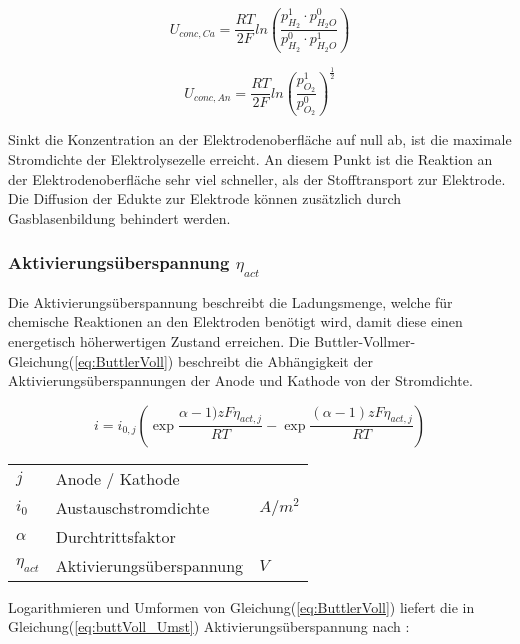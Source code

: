 \documentclass[onecolumn,10pt,titlepage]{article}
\begin{document}
	\begin{equation}
		U_{conc,Ca} = \frac{RT}{2F}ln{\left(\frac{p_{H_2}^1 \cdot p_{H_2O}^0}{p_{H_2}^0\cdot p_{H_2O}^1}\right)}
		\label{eq:konz_Cath}
	\end{equation}

	\begin{equation}
		U_{conc,An} = \frac{RT}{2F}ln{\left(\frac{p_{O_2}^1}{p_{O_2}^0}\right)}^{\frac{1}{2}}
		\label{eq:konz_AN}
	\end{equation}


	Sinkt die Konzentration an der Elektrodenoberfläche auf null ab, ist die maximale Stromdichte der Elektrolysezelle erreicht. An diesem Punkt ist die Reaktion an der Elektrodenoberfläche sehr viel schneller, als der Stofftransport zur Elektrode.\cite{UniversitatUlm.2016} Die Diffusion der Edukte zur Elektrode können zusätzlich durch Gasblasenbildung behindert werden.

	\subsubsection*{Aktivierungsüberspannung $\eta_{act}$}
	Die Aktivierungsüberspannung beschreibt die Ladungsmenge, welche für chemische Reaktionen an den Elektroden benötigt wird, damit diese einen energetisch höherwertigen Zustand erreichen.\cite{Klein.2013} Die Buttler-Vollmer-Gleichung(\ref{eq:ButtlerVoll}) \cite{NI.2007} beschreibt die Abhängigkeit der Aktivierungsüberspannungen der Anode und Kathode von der Stromdichte.

	\begin{equation}
		i=i_{0,j}\left(\exp{\frac{\alpha -1)zF\eta_{act,j}}{RT}-\exp{\frac{(\alpha -1)zF\eta_{act,j}}{RT}}}\right)
		\label{eq:ButtlerVoll}
	\end{equation}


			\begin{table}[H]
				\begin{tabular*}{\textwidth}{lll}
					$j$&Anode / Kathode&\\
					$i_0$&Austauschstromdichte&$A/m^2$\\
					$\alpha$&Durchtrittsfaktor&\\
					$\eta_{act}$&Aktivierungsüberspannung&$V$\\
				\end{tabular*}
			\end{table}

			Logarithmieren und Umformen von Gleichung(\ref{eq:ButtlerVoll}) liefert die in Gleichung(\ref{eq:buttVoll_Umst}) Aktivierungsüberspannung nach :
\end{document}
